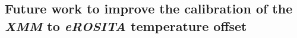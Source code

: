 \documentclass[fleqn,usenatbib]{mnras}
\begin{document}





\subsection{Future work to improve the calibration of the {\em XMM} to {\em eROSITA} temperature offset}
\end{document}
